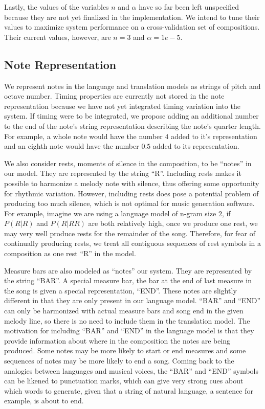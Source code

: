 \documentclass{sig-alternate}
\begin{document}
Lastly, the values of the variables $n$ and $\alpha$ have so far been left unspecified because they are not yet finalized in the implementation. We intend to tune their values to maximize system performance on a cross-validation set of compositions. Their current values, however, are $n = 3$ and $\alpha = 1e-5$.

\subsection{Note Representation}
We represent notes in the language and translation models as strings of pitch and octave number. Timing properties are currently not stored in the note representation because we have not yet integrated timing variation into the system. If timing were to be integrated, we propose adding an additional number to the end of the note's string representation describing the note's quarter length. For example, a whole note would have the number $4$ added to it's representation and an eighth note would have the number $0.5$ added to its representation. 

We also consider rests, moments of silence in the composition, to be ``notes'' in our model. They are represented by the string ``R''. Including rests makes it possible to harmonize a melody note with silence, thus offering some opportunity for rhythmic variation. However, including rests does pose a potential problem of producing too much silence, which is not optimal for music generation software. For example, imagine we are using a language model of n-gram size $2$, if $P(R | R)$ and $P (R | R R)$ are both relatively high, once we produce one rest, we may very well produce rests for the remainder of the song. Therefore, for fear of continually producing rests, we treat all contiguous sequences of rest symbols in a composition as one rest ``R'' in the model.

Measure bars are also modeled as ``notes'' our system. They are represented by the string ``BAR''. A special measure bar, the bar at the end of last measure in the song is given a special representation, ``END''. These notes are slightly different in that they are only present in our language model. ``BAR'' and ``END'' can only be harmonized with actual measure bars and song end in the given melody line, so there is no need to include them in the translation model. The motivation for including ``BAR'' and ``END'' in the language model is that they provide information about where in the composition the notes are being produced. Some notes may be more likely to start or end measures and some sequences of notes may be more likely to end a song. Coming back to the analogies between languages and musical voices, the ``BAR'' and ``END'' symbols can be likened to punctuation marks, which can give very strong cues about which words to generate, given that a string of natural language, a sentence for example, is about to end.
\end{document}
